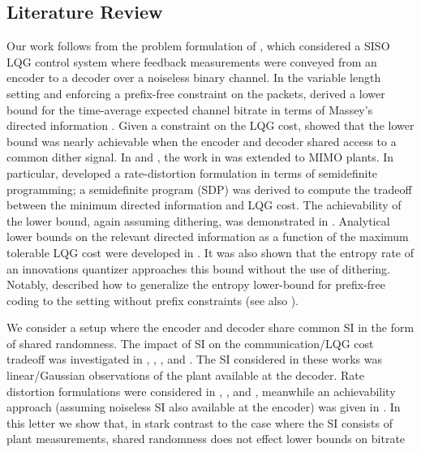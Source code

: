 \documentclass[letterpaper, 10 pt, conference]{ieeeconf}  %
\newcounter{constraint}[section]
\begin{document}
\subsection{Literature Review}
Our work follows from the problem formulation of \cite{silvaFirst}, which considered a SISO LQG control system where feedback measurements were conveyed from an encoder to a decoder over a noiseless binary channel. In the variable length setting and enforcing a prefix-free constraint on the packets, \cite{silvaFirst} derived a lower bound for the time-average expected channel bitrate in terms of Massey's directed information \cite{masseyDI}. Given a constraint on the LQG cost, \cite{silvaFirst} showed that the lower bound was nearly achievable when the encoder and decoder shared access to a common dither signal. In \cite{SDP_DI} and \cite{tanakaISIT}, the work in \cite{silvaFirst} was extended to MIMO plants. In particular, \cite{SDP_DI} developed a rate-distortion formulation in terms of semidefinite programming; a semidefinite program (SDP) was derived to compute the tradeoff between the minimum directed information and LQG cost. The achievability of the lower bound, again assuming dithering, was demonstrated in \cite{tanakaISIT}. Analytical lower bounds on the relevant directed information as a function of the maximum tolerable LQG cost were developed in \cite{kostinaTradeoff}. It was also shown that the entropy rate of an innovations quantizer approaches this bound without the use of dithering. Notably, \cite{kostinaTradeoff} described how to generalize the entropy lower-bound for prefix-free coding to the setting without prefix constraints (see also \cite{verduVariableLength}). 

We consider a setup where the encoder and decoder share common SI in the form of shared randomness. The impact of SI on the communication/LQG cost tradeoff was investigated in \cite{kostinaSI}, \cite{photisSI}, \cite{oronNew},  and \cite{ourciss}. The SI considered in these works was linear/Gaussian observations of the plant available at the decoder. Rate distortion formulations were considered in \cite{kostinaSI}, \cite{photisSI}, and \cite{oronNew}, meanwhile an achievability approach (assuming noiseless SI also available at the encoder) was given in \cite{ourciss}. In this letter we show that, in stark contrast to the case where the SI consists of plant measurements, shared randomness does not effect lower bounds on bitrate
\end{document}
